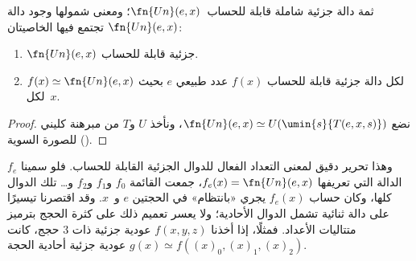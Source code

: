 \documentclass[../../../include/open-logic-section]{subfiles}
\begin{document}

\begin{thm}
ثمة دالة جزئية شاملة قابلة للحساب~$\fn{Un}(e,x)$؛ ومعنى شمولها وجود
دالة $\fn{Un}(e,x)$ تجتمع فيها الخاصيتان:
\begin{enumerate}
\item $\fn{Un}(e,x)$ جزئية قابلة للحساب.
\item لكل دالة جزئية قابلة للحساب $f(x)$ عدد طبيعي $e$
بحيث $f(x)\simeq\fn{Un}(e,x)$ لكل~$x$.
\end{enumerate}
\end{thm}

\begin{proof}
نضع $\fn{Un}(e,x)\simeq U(\umin{s}{T(e,x,s)})$، ونأخذ $U$ و$T$ من
مبرهنة كليني للصورة السوية ().
\end{proof}

\begin{explain}
وهذا تحرير دقيق لمعنى التعداد الفعال للدوال الجزئية
القابلة للحساب. فلو سمينا $f_e$ الدالة التي تعريفها
$f_e(x)=\fn{Un}(e,x)$، جمعت القائمة $f_0$ و$f_1$ و$f_2$ و…
تلك الدوال كلها، وكان حساب $f_e(x)$ يجري
«بانتظام» في الحجتين $e$ و~$x$. وقد اقتصرنا تيسيرًا على دالة ثنائية تشمل
الدوال الأحادية؛ ولا يعسر تعميم ذلك على كثرة الحجج
بترميز متتاليات الأعداد. فمثلًا، إذا أخذنا $f(x,y,z)$ عودية
جزئية ذات $3$ حجج، كانت
$g(x)\simeq f((x)_0,(x)_1,(x)_2)$ عودية جزئية أحادية الحجة.
\end{explain}
\end{document}
